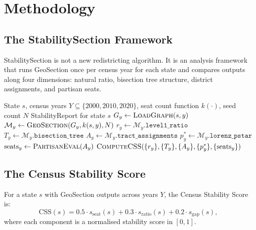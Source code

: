 \section{Methodology}
\label{sec:methodology}

\subsection{The StabilitySection Framework}

StabilitySection is not a new redistricting algorithm.
It is an analysis framework that runs GeoSection once per census year for
each state and compares outputs along four dimensions:
natural ratio, bisection tree structure, district assignments, and partisan seats.

\begin{algorithm}
\caption{StabilitySection}
\label{alg:stabilitysection}
\begin{algorithmic}[1]
\Require State $s$, census years $Y \subseteq \{2000, 2010, 2020\}$,
         seat count function $k(\cdot)$, seed count $N$
\Ensure StabilityReport for state $s$
  \State $G_y \gets \textsc{LoadGraph}(s, y)$ 
  \State $\mathcal{M}_y \gets \textsc{GeoSection}(G_y, k(s, y), N)$
  \State $r_y \gets \mathcal{M}_y.\texttt{level1\_ratio}$
  \State $T_y \gets \mathcal{M}_y.\texttt{bisection\_tree}$
  \State $A_y \gets \mathcal{M}_y.\texttt{tract\_assignments}$
  \State $p^*_y \gets \mathcal{M}_y.\texttt{lorenz\_pstar}$
  \State $\text{seats}_y \gets \textsc{PartisanEval}(A_y)$
\EndFor
\State \Return $\textsc{ComputeCSS}(\{r_y\}, \{T_y\}, \{A_y\}, \{p^*_y\}, \{\text{seats}_y\})$
\end{algorithmic}
\end{algorithm}

\subsection{The Census Stability Score}
\label{sec:css-definition}

\begin{definition}
For a state $s$ with GeoSection outputs across years $Y$, the
Census Stability Score is:
\[
  \mathrm{CSS}(s) = 0.5 \cdot s_{\text{seat}}(s)
                  + 0.3 \cdot s_{\text{ratio}}(s)
                  + 0.2 \cdot s_{\text{gap}}(s),
\]
where each component is a normalised stability score in $[0,1]$.
\end{definition}

